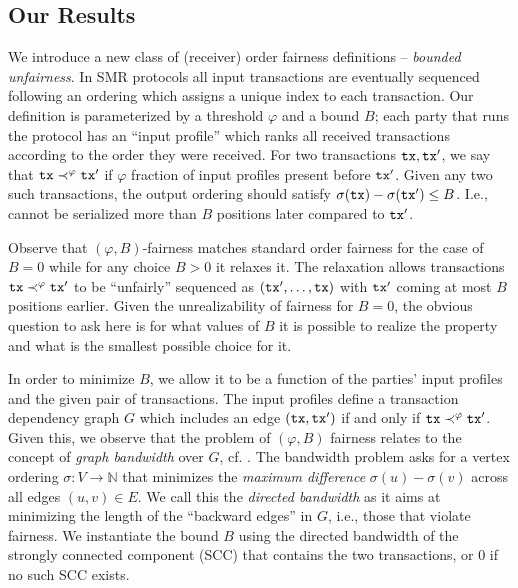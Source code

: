 \subsection{Our Results}
\label{subsec:our-results}

We introduce a new class of (receiver) order fairness definitions -- \emph{bounded unfairness}.
%
In SMR protocols all input transactions are eventually sequenced following an ordering \orderOutput which assigns a unique index to each transaction.
%
Our definition is parameterized by a threshold $\varphi$ and a bound $B$; each party that runs the protocol has an ``input profile'' which ranks all received transactions according to the order they were received.
%
For two transactions $\mathtt{tx}, \mathtt{tx}'$, we say that $\mathtt{tx} \prec^\varphi \mathtt{tx}'$ if $\varphi$ fraction of input profiles present \tx before $\mathtt{tx}'$.
%
Given any two such transactions, the output ordering \orderOutput should satisfy
$\sigma(\mathtt{tx}) - \sigma(\mathtt{tx}') \leq B$.
%
I.e., \tx cannot be serialized more than $B$ positions later compared to $\mathtt{tx}'$.

Observe that $(\varphi, B)$-fairness matches standard order fairness for the case of $B = 0$ while for any choice $B > 0$ it relaxes it.
%
The relaxation allows transactions $\mathtt{tx} \prec^\varphi \mathtt{tx}'$ to be ``unfairly'' sequenced as $(\mathtt{tx}', \ldots, \mathtt{tx})$ with $\mathtt{tx}'$ coming at most $B$ positions earlier.
%
Given the unrealizability of fairness for $B = 0$, the obvious question to ask here is for what values of $B$ it is possible to realize the property and what is the smallest possible choice for it.

In order to minimize $B$, we allow it to be a function of the parties' input profiles and the given pair of transactions.
%
The input profiles define a transaction dependency graph $G$ which includes an edge $(\mathtt{tx}, \mathtt{tx}')$  if and only if $\mathtt{tx} \prec^\varphi \mathtt{tx}'$. Given this, we observe that the problem of $(\varphi, B)$ fairness relates to the concept of \emph{graph bandwidth} over $G$, cf. \cite{FSTTCS:JKLSS19}.
%
The bandwidth problem asks for a vertex ordering $\sigma: V \rightarrow \mathbb{N}$ that minimizes the \emph{maximum difference} $\sigma(u) - \sigma(v)$ across all edges $(u,v) \in E$.
%
We call this the \emph{directed bandwidth} as it aims at minimizing the length of the ``backward edges'' in $G$, i.e., those that violate fairness.
%
We instantiate  the bound $B$ using the directed bandwidth of the strongly connected component (SCC) that contains the two transactions, or 0 if no such SCC exists.

